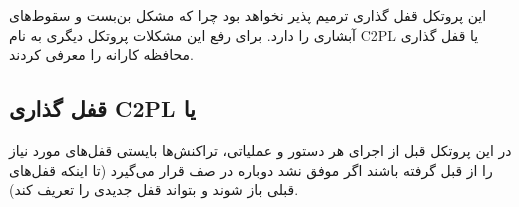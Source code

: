 \begin{LTR}
    \begin{table}[h]
        \begin{RTL}
            \caption{زمانبندی $S_{6}$}
        \end{RTL}
        \centering
    \end{table}
\end{LTR}

این پروتکل قفل گذاری ترمیم پذیر نخواهد بود چرا که مشکل بن‌بست و سقوط‌های آبشاری
را دارد. برای رفع این مشکلات پروتکل دیگری به نام C2PL یا قفل گذاری محافظه کارانه
را معرفی کردند.

\subsection{قفل گذاری C2PL یا }

در این پروتکل قبل از اجرای هر دستور و عملیاتی، تراکنش‌ها بایستی قفل‌های مورد
نیاز را از قبل گرفته باشند اگر موفق نشد دوباره در صف قرار می‌گیرد (تا اینکه
قفل‌های قبلی باز شوند و بتواند قفل جدیدی را تعریف کند).

\begin{LTR}
    \begin{table}[h]
        \begin{RTL}
            \caption{زمانبندی $S_{7}$}
        \end{RTL}
        \centering
    \end{table}
\end{LTR}

